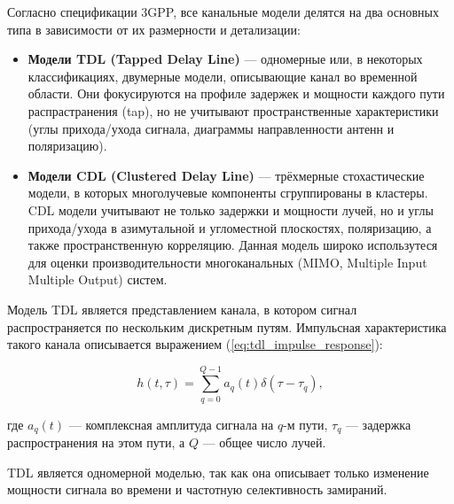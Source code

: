 Согласно спецификации 3GPP, все канальные модели делятся на два основных типа в зависимости 
от их размерности и детализации:

\begin{itemize}
\item \textbf{Модели TDL (Tapped Delay Line)} 
    — одномерные или, в некоторых классификациях,
    двумерные модели, описывающие канал во временной области.
    Они фокусируются на профиле задержек и мощности каждого пути распрастранения (tap),
    но не учитывают пространственные характеристики (углы прихода/ухода сигнала,
    диаграммы направленности антенн и поляризацию).

\item \textbf{Модели CDL (Clustered Delay Line)}
    — трёхмерные стохастические модели,
    в которых многолучевые компоненты сгруппированы в кластеры.
    CDL модели учитывают не только задержки и мощности лучей,
    но и углы прихода/ухода в азимутальной и угломестной плоскостях,
    поляризацию, а также пространственную корреляцию. Данная модель широко использутеся 
    для оценки производительности многоканальных (MIMO, Multiple Input Multiple Output) систем.
\end{itemize}


Модель TDL является представлением канала,
в котором сигнал распространяется по нескольким дискретным путям.
Импульсная характеристика такого канала описывается выражением (\ref{eq:tdl_impulse_response}):

\begin{equation}
    h(t, \tau) = \sum_{q = 0}^{Q - 1} a_q(t) \delta (\tau - \tau_q),
    \label{eq:tdl_impulse_response}
\end{equation}

\noindent где $a_q(t)$ — комплексная амплитуда сигнала на $q$-м пути,
$\tau_q$ — задержка распространения на этом пути, а $Q$ — общее число лучей.

TDL является одномерной моделью, так как она описывает только изменение мощности сигнала
во времени и частотную селективность замираний.

